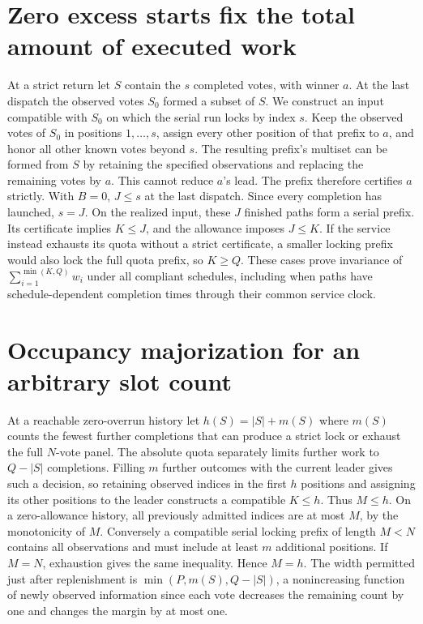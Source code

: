 \section{Zero excess starts fix the total amount of executed work}\label{app:zero}
At a strict return let \(S\) contain the \(s\) completed votes, with winner \(a\). At the last dispatch the observed votes \(S_0\) formed a subset of \(S\). We construct an input compatible with \(S_0\) on which the serial run locks by index \(s\). Keep the observed votes of \(S_0\) in positions \(1,\ldots,s\), assign every other position of that prefix to \(a\), and honor all other known votes beyond \(s\). The resulting prefix's multiset can be formed from \(S\) by retaining the specified observations and replacing the remaining votes by \(a\). This cannot reduce \(a\)'s lead. The prefix therefore certifies \(a\) strictly. With \(B=0\), \(J\le s\) at the last dispatch. Since every completion has launched, \(s=J\). On the realized input, these \(J\) finished paths form a serial prefix. Its certificate implies \(K\le J\), and the allowance imposes \(J\le K\). If the service instead exhausts its quota without a strict certificate, a smaller locking prefix would also lock the full quota prefix, so \(K\ge Q\). These cases prove invariance of \(\sum_{i=1}^{\min(K,Q)}w_i\) under all compliant schedules, including when paths have schedule-dependent completion times through their common service clock.

\section{Occupancy majorization for an arbitrary slot count}\label{app:major}
At a reachable zero-overrun history let \(h(S)=|S|+m(S)\) where \(m(S)\) counts the fewest further completions that can produce a strict lock or exhaust the full \(N\)-vote panel. The absolute quota separately limits further work to \(Q-|S|\) completions. Filling \(m\) further outcomes with the current leader gives such a decision, so retaining observed indices in the first \(h\) positions and assigning its other positions to the leader constructs a compatible \(K\le h\). Thus \(M\le h\). On a zero-allowance history, all previously admitted indices are at most \(M\), by the monotonicity of \(M\). Conversely a compatible serial locking prefix of length \(M<N\) contains all observations and must include at least \(m\) additional positions. If \(M=N\), exhaustion gives the same inequality. Hence \(M=h\). The width permitted just after replenishment is \(\min(P,m(S),Q-|S|)\), a nonincreasing function of newly observed information since each vote decreases the remaining count by one and changes the margin by at most one.

